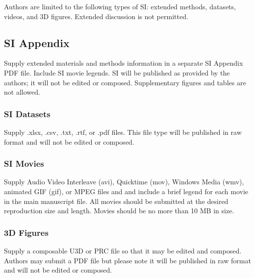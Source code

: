 \documentclass[9pt,twocolumn,twoside,lineno]{pnas-new}
\begin{document}
Authors are limited to the following types of SI: extended methods, datasets, videos, and 3D figures. Extended discussion is not permitted.

\subsection*{SI Appendix}

Supply extended materials and methods information in a separate SI Appendix PDF file. Include SI movie legends. SI will be published as provided by the authors; it will not be edited or composed. Supplementary figures and tables are not allowed.


\subsubsection*{SI Datasets} 

Supply .xlsx, .csv, .txt, .rtf, or .pdf files. This file type will be published in raw format and will not be edited or composed.


\subsubsection*{SI Movies}

Supply Audio Video Interleave (avi), Quicktime (mov), Windows Media (wmv), animated GIF (gif), or MPEG files and and include a brief legend for each movie in the main manuscript file. All movies should be submitted at the desired reproduction size and length. Movies should be no more than 10 MB in size.


\subsubsection*{3D Figures}

Supply a composable U3D or PRC file so that it may be edited and composed. Authors may submit a PDF file but please note it will be published in raw format and will not be edited or composed.



\showmatmethods{} %


\showacknow{} %


\end{document}
